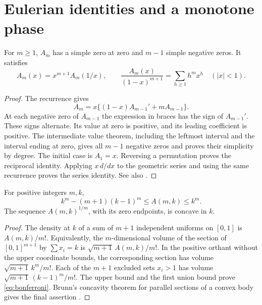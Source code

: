 \section{Eulerian identities and a monotone phase}

\begin{lemma}\label{lem:eulerian}
For $m\ge1$, $A_m$ has a simple zero at zero and $m-1$ simple negative zeros. It satisfies
\[
A_m(x)=x^{m+1}A_m(1/x),\qquad
\frac{A_m(x)}{(1-x)^{m+1}}=\sum_{h\ge1}h^m x^h\quad(|x|<1).
\]
\end{lemma}
\begin{proof}
The recurrence gives
\[
A_m=x\{(1-x)A_{m-1}'+mA_{m-1}\}.
\]
At each negative zero of $A_{m-1}$ the expression in braces has the sign of $A_{m-1}'$. These signs alternate. Its value at zero is positive, and its leading coefficient is positive. The intermediate value theorem, including the leftmost interval and the interval ending at zero, gives all $m-1$ negative zeros and proves their simplicity by degree. The initial case is $A_1=x$. Reversing a permutation proves the reciprocal identity. Applying $x\,d/dx$ to the geometric series and using the same recurrence proves the series identity. See also \cite{Petersen2015}.
\end{proof}

\begin{lemma}\label{lem:bonferroni}
For positive integers $m,k$,
\begin{equation}\label{eq:bonferroni}
k^m-(m+1)(k-1)^m\le A(m,k)\le k^m.
\end{equation}
The sequence $A(m,k)^{1/m}$, with its zero endpoints, is concave in $k$.
\end{lemma}
\begin{proof}
The density at $k$ of a sum of $m+1$ independent uniforms on $[0,1]$ is $A(m,k)/m!$. Equivalently, the $m$-dimensional volume of the section of $[0,1]^{m+1}$ by $\sum x_i=k$ is $\sqrt{m+1}\,A(m,k)/m!$. In the positive orthant without the upper coordinate bounds, the corresponding section has volume $\sqrt{m+1}\,k^m/m!$. Each of the $m+1$ excluded sets $x_i>1$ has volume $\sqrt{m+1}\,(k-1)^m/m!$. The upper bound and the first union bound prove \eqref{eq:bonferroni}. Brunn's concavity theorem for parallel sections of a convex body gives the final assertion \cite{Gardner2002}.
\end{proof}


